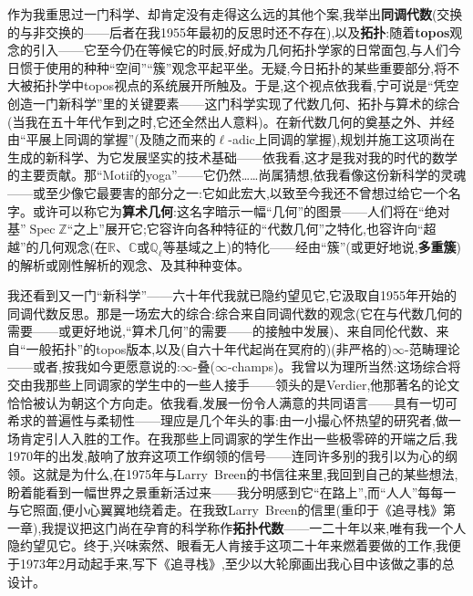 作为我重思过一门科学、却肯定没有走得这么远的其他个案,我举出\textbf{同调代数}(交换的与非交换的——后者在我1955年最初的反思时还不存在),以及\textbf{拓扑}:随着\textbf{topos}观念的引入——它至今仍在等候它的时辰,好成为几何拓扑学家的日常面包,与人们今日惯于使用的种种“空间”“簇”观念平起平坐。无疑,今日拓扑的某些重要部分,将不大被拓扑学中topos视点的系统展开所触及\dmark{}。于是,这个视点依我看,宁可说是“凭空创造一门新科学”里的关键要素——这门科学实现了代数几何、拓扑与算术的综合(当我在五十年代乍到之时,它还全然出人意料)。在新代数几何的奠基之外、并经由“平展上同调的掌握”(及随之而来的$\ell$-adic上同调的掌握),规划并施工这项尚在生成的新科学、为它发展坚实的技术基础——依我看,这才是我对我的时代的数学的主要贡献。那“Motif的yoga”——它仍然……尚属猜想,依我看像这份新科学的灵魂——或至少像它最要害的部分之一:它如此宏大,以致至今我还不曾想过给它一个名字。或许可以称它为\textbf{算术几何}:这名字暗示一幅“几何”的图景——人们将在“绝对基”$\operatorname{Spec}\mathbb{Z}$“之上”展开它;它容许向各种特征的“代数几何”之特化,也容许向“超越”的几何观念(在$\mathbb{R}$、$\mathbb{C}$或$\mathbb{Q}_\ell$等基域之上)的特化——经由“簇”(或更好地说,\textbf{多重簇})的解析或刚性解析的观念、及其种种变体。

我还看到又一门“新科学”——六十年代我就已隐约望见它,它汲取自1955年开始的同调代数反思。那是一场宏大的综合:综合来自同调代数的观念(它在与代数几何的需要——或更好地说,“算术几何”的需要——的接触中发展)、来自同伦代数、来自“一般拓扑”的topos版本,以及(自六十年代起尚在冥府的)(非严格的)$\infty$-范畴理论——或者,按我如今更愿意说的:$\infty$-叠($\infty$-champs)。我曾以为理所当然:这场综合将交由我那些上同调家的学生中的一些人接手——领头的是Verdier,他那著名的论文恰恰被认为朝这个方向走。依我看,发展一份令人满意的共同语言——具有一切可希求的普遍性与柔韧性——理应是几个年头的事:由一小撮心怀热望的研究者,做一场肯定引人入胜的工作。在我那些上同调家的学生作出一些极零碎的开端之后,我1970年的出发,敲响了放弃这项工作纲领的信号——连同许多别的我引以为心的纲领。这就是为什么,在1975年与Larry~Breen的书信往来里,我回到自己的某些想法,盼着能看到一幅世界之景重新活过来——我分明感到它“在路上”,而“人人”每每一与它照面,便小心翼翼地绕着走。在我致Larry~Breen的信里(重印于《追寻栈》第一章),我提议把这门尚在孕育的科学称作\textbf{拓扑代数}——一二十年以来,唯有我一个人隐约望见它。终于,兴味索然、眼看无人肯接手这项二十年来燃着要做的工作,我便于1973年2月动起手来,写下《追寻栈》,至少以大轮廓画出我心目中该做之事的总设计。

